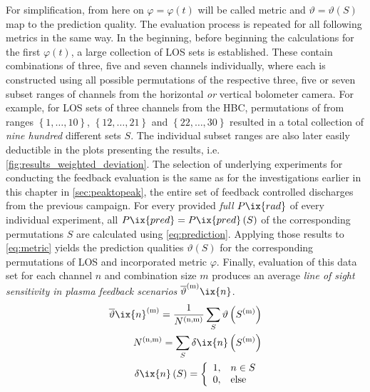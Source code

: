             For simplification, from here on $\varphi=\varphi\left(t\right)$ will be called metric and $\vartheta=\vartheta\left(S\right)$ map to the prediction quality. The evaluation process is repeated for all following metrics in the same way. In the beginning, before beginning the calculations for the first $\varphi\left(t\right)$, a large collection of LOS sets is established. These contain combinations of three, five and seven channels individually, where each is constructed using all possible permutations of the respective three, five or seven subset ranges of channels from the horizontal \textit{or} vertical bolometer camera. For example, for LOS sets of three channels from the HBC, permutations of from ranges $\left\{1, \dots, 10\right\}$, $\left\{12, \dots, 21\right\}$ and $\left\{22, \dots, 30\right\}$ resulted in a total collection of \textit{nine hundred} different sets $S$. The individual subset ranges are also later easily deductible in the plots presenting the results, i.e. \cref{fig:results_weighted_deviation}. The selection of underlying experiments for conducting the feedback evaluation is the same as for the investigations earlier in this chapter in \cref{sec:peaktopeak}, the entire set of feedback controlled discharges from the previous campaign. For every provided \textit{full} $P\ix{rad}$ of every individual experiment, all $P\ix{pred}=P\ix{pred}\left(S\right)$ of the corresponding permutations $S$ are calculated using \cref{eq:prediction}. Applying those results to \cref{eq:metric} yields the prediction qualities $\vartheta\left(S\right)$ for the corresponding permutations of LOS and incorporated metric $\varphi$. Finally, evaluation of this data set for each channel $n$ and combination size $m$ produces an average \textit{line of sight sensitivity in plasma feedback scenarios} $\overline{\vartheta}^{\left(\text{m}\right)}\ix{n}$.%
%
            \begin{align}%
                \begin{split}\label{eq:sensitivity}%
                    \overline{\vartheta}\ix{n}^{\left(\text{m}\right)}=\frac{1}{N^{\left(\text{n,m}\right)}}\sum_{S}\vartheta\left(S^{\left(\text{m}\right)}\right)\\%
                    N^{\left(\text{n,m}\right)}=\sum_{S}\delta\ix{n}\left(S^{\left(\text{m}\right)}\right)\\%
                    \delta\ix{n}\left(S\right)=\left\{%
                    \begin{array}{ll}%
                        1,&n\in S\\%
                        0,&\text{else}%
                    \end{array}\right.%
                \end{split}%
            \end{align}%
